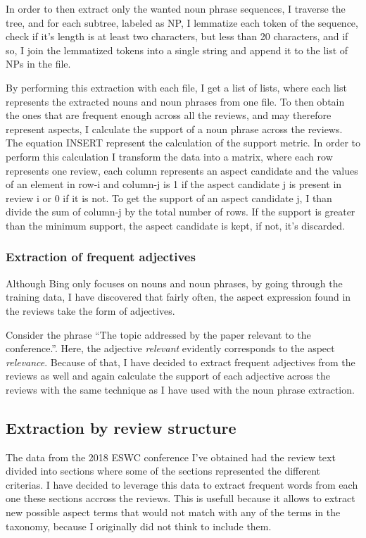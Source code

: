 In order to then extract only the wanted noun phrase sequences, I traverse the tree, and for each subtree, labeled as NP, I lemmatize each token of the sequence, check if it's length is at least two characters, but less than 20 characters, and if so, I join the lemmatized tokens into a single string and append it to the list of NPs in the file.

By performing this extraction with each file, I get a list of lists, where each list represents the extracted nouns and noun phrases from one file. To then obtain the ones that are frequent enough across all the reviews, and may therefore represent aspects, I calculate the support of a noun phrase across the reviews. The equation INSERT represent the calculation of the support metric. In order to perform this calculation I transform the data into a matrix, where each row represents one review, each column represents an aspect candidate and the values of an element in row-i and column-j is 1 if the aspect candidate j is present in review i or 0 if it is not. To get the support of an aspect candidate j, I than divide the sum of column-j by the total number of rows. If the support is greater than the minimum support, the aspect candidate is kept, if not, it's discarded. 

\subsubsection{Extraction of frequent adjectives}
Although Bing only focuses on nouns and noun phrases, by going through the training data, I have discovered that fairly often, the aspect expression found in the reviews take the form of adjectives. 

Consider the phrase ``The topic addressed by the paper relevant to the conference.''. Here, the adjective \textit{relevant} evidently corresponds to the aspect \textit{relevance}. Because of that, I have decided to extract frequent adjectives from the reviews as well and again calculate the support of each adjective across the reviews with the same technique as I have used with the noun phrase extraction. 
\subsection{Extraction by review structure}
The data from the 2018 ESWC conference I've obtained had the review text divided into sections where some of the sections represented the different criterias. I have decided to leverage this data to extract frequent words from each one these sections accross the reviews. This is usefull because it allows to extract new possible aspect terms that would not match with any of the terms in the taxonomy, because I originally did not think to  include them.
